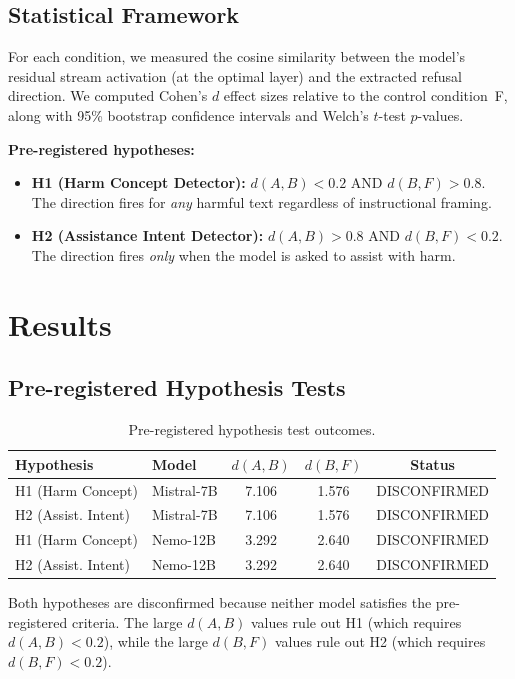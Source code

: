 \documentclass[12pt]{article}
\begin{document}
\subsection{Statistical Framework}

For each condition, we measured the cosine similarity between the model's residual stream activation (at the optimal layer) and the extracted refusal direction. We computed Cohen's $d$ effect sizes relative to the control condition~F, along with 95\% bootstrap confidence intervals and Welch's $t$-test $p$-values.

\textbf{Pre-registered hypotheses:}
\begin{itemize}[noitemsep]
    \item \textbf{H1 (Harm Concept Detector):} $d(A,B) < 0.2$ AND $d(B,F) > 0.8$. The direction fires for \textit{any} harmful text regardless of instructional framing.
    \item \textbf{H2 (Assistance Intent Detector):} $d(A,B) > 0.8$ AND $d(B,F) < 0.2$. The direction fires \textit{only} when the model is asked to assist with harm.
\end{itemize}

\section{Results}

\subsection{Pre-registered Hypothesis Tests}

\begin{table}[H]
\centering
\caption{Pre-registered hypothesis test outcomes.}
\begin{tabular}{llccc}
\toprule
Hypothesis & Model & $d(A,B)$ & $d(B,F)$ & Status \\
\midrule
H1 (Harm Concept) & Mistral-7B & 7.106 & 1.576 & DISCONFIRMED \\
H2 (Assist. Intent) & Mistral-7B & 7.106 & 1.576 & DISCONFIRMED \\
H1 (Harm Concept) & Nemo-12B & 3.292 & 2.640 & DISCONFIRMED \\
H2 (Assist. Intent) & Nemo-12B & 3.292 & 2.640 & DISCONFIRMED \\
\bottomrule
\end{tabular}
\end{table}

Both hypotheses are disconfirmed because neither model satisfies the pre-registered criteria. The large $d(A,B)$ values rule out H1 (which requires $d(A,B)<0.2$), while the large $d(B,F)$ values rule out H2 (which requires $d(B,F)<0.2$).
\end{document}
